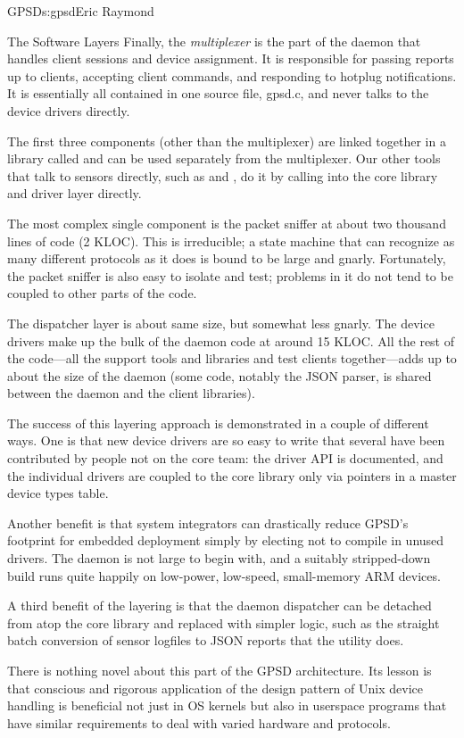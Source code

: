 \begin{aosachapter}{GPSD}{s:gpsd}{Eric Raymond}
\begin{aosasect1}{The Software Layers}
Finally, the \emph{multiplexer} is the part of the daemon that handles
client sessions and device assignment.  It is responsible for passing
reports up to clients, accepting client commands, and responding to
hotplug notifications. It is essentially all contained in one source
file, gpsd.c, and never talks to the device drivers directly.

The first three components (other than the multiplexer) are linked
together in a library called  and can be used separately
from the multiplexer. Our other tools that talk to sensors directly,
such as  and , do it by calling into the
core library and driver layer directly.

The most complex single component is the packet sniffer at about two
thousand lines of code (2 KLOC).  This is irreducible; a state machine
that can recognize as many different protocols as it does is bound to
be large and gnarly.  Fortunately, the packet sniffer is also easy to
isolate and test; problems in it do not tend to be coupled to other
parts of the code.

The dispatcher layer is about same size, but somewhat less gnarly.
The device drivers make up the bulk of the daemon code at around 15
KLOC.  All the rest of the code---all the support tools and libraries
and test clients together---adds up to about the size of the daemon
(some code, notably the JSON parser, is shared between the daemon and
the client libraries).

The success of this layering approach is demonstrated in a couple of
different ways.  One is that new device drivers are so easy to write
that several have been contributed by people not on the core team: the
driver API is documented, and the individual drivers are coupled to
the core library only via pointers in a master device types table.

Another benefit is that system integrators can drastically reduce
GPSD's footprint for embedded deployment simply by electing not to
compile in unused drivers.  The daemon is not large to begin with, and
a suitably stripped-down build runs quite happily on low-power,
low-speed, small-memory ARM devices.

A third benefit of the layering is that the daemon dispatcher can be
detached from atop the core library and replaced with simpler logic,
such as the straight batch conversion of sensor logfiles to JSON
reports that the  utility does.

There is nothing novel about this part of the GPSD architecture. Its
lesson is that conscious and rigorous application of the design
pattern of Unix device handling is beneficial not just in OS kernels
but also in userspace programs that have similar requirements to deal
with varied hardware and protocols.


\end{aosasect1}
\end{aosachapter}
